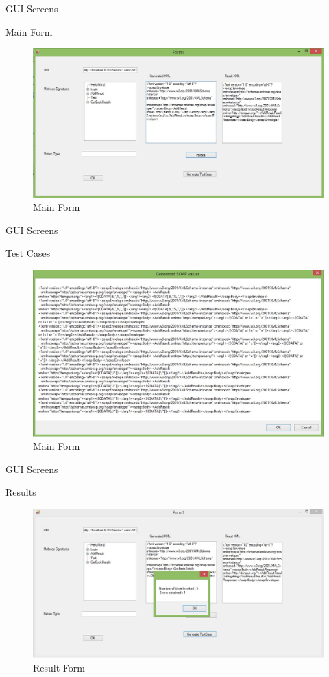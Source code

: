 \documentclass{beamer}
\begin{document}
\begin{frame}{GUI Screens}
	\begin{block}{Main Form}
		\begin{figure}
			\centering
			\includegraphics[width=0.7\linewidth]{MainForm1}
			\caption{Main Form}
			\label{fig:MainForm}
		\end{figure}
		
		
	\end{block}
	
\end{frame}
\begin{frame}{GUI Screens}
	\begin{block}{Test Cases}
		\begin{figure}
			\centering
			\includegraphics[width=0.7\linewidth]{TestCases}
			\caption{Main Form}
			\label{fig:Test Case Form}
		\end{figure}	
	\end{block}
\end{frame}
\begin{frame}{GUI Screens}
	\begin{block}{Results}
		\begin{figure}
			\centering
			\includegraphics[width=0.7\linewidth]{Result}
			\caption{Result Form}
			\label{fig:MainForm}
		\end{figure}	
	\end{block}
\end{frame}
\end{document}
